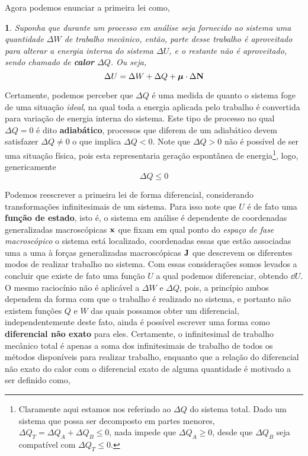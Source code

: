 \documentclass[twoside]{amsart}
\numberwithin{equation}{section}
\newcommand{\thistheoremname}{}
\newtheorem*{genericthm}{\thistheoremname}
\newenvironment{namedthm}[1]
  {\renewcommand{\thistheoremname}{#1}
   \begin{genericthm}}
  {\end{genericthm}}
\begin{document}
\begin{refsection}
Agora podemos enunciar a primeira lei como,

\begin{namedthm}{Primeira Lei}
    Suponha que durante um processo em análise seja fornecido ao sistema uma quantidade $\Delta W$ de trabalho mecânico, 
    então, parte desse trabalho é aproveitado para alterar a energia interna do sistema $\Delta U$, e o restante não é 
    aproveitado, sendo chamado de \textbf{calor} $\Delta Q$. Ou seja, \begin{equation}\Delta U=\Delta W+\Delta Q+\boldsymbol\mu\cdot\Delta\vb N\end{equation}
\end{namedthm}

Certamente, podemos perceber que $\Delta Q$ é uma medida de quanto o sistema foge de uma situação \emph{ideal}, na 
qual toda a energia aplicada pelo trabalho é convertida para variação de energia interna do sistema. Este tipo de 
processo no qual $\Delta Q=0$ é dito \textbf{adiabático}, processos que diferem de um adiabático devem satisfazer 
$\Delta Q\neq 0$ o que implica $\Delta Q<0$. Note que $\Delta Q>0$ não é possível de ser uma situação física, pois 
esta representaria geração espontânea de energia\footnote{Claramente aqui estamos nos referindo ao $\Delta Q$ do sistema 
total. Dado um sistema que possa ser decomposto em partes menores, $\Delta Q_T=\Delta Q_A+\Delta Q_B\leq 0$, nada 
impede que $\Delta Q_A\geq 0$, desde que $\Delta Q_B$ seja compatível com $\Delta Q_T\leq 0$.}, logo, genericamente 
$$\Delta Q\leq 0$$

Podemos reescrever a primeira lei de forma diferencial, considerando transformações infinitesimais de um sistema. Para isso 
note que $U$ é de fato uma \textbf{função de estado}, isto é, o sistema em análise é dependente de coordenadas 
generalizadas macroscópicas $\vb x$ que fixam em qual ponto do \emph{espaço de fase macroscópico} o sistema está 
localizado, coordenadas essas que estão associadas uma a uma à forças generalizadas macroscópicas $\vb J$ que descrevem 
os diferentes modos de realizar trabalho no sistema. Com essas considerações somos levados a concluir que existe de 
fato uma função $U$ a qual podemos diferenciar, obtendo $\dd{U}$. O mesmo raciocínio não é aplicável a $\Delta W$ 
e $\Delta Q$, pois, a princípio ambos dependem da forma com que o trabalho é realizado no sistema, e portanto não existem 
funções $Q$ e $W$ das quais possamos obter um diferencial, independentemente deste fato, ainda é 
possível escrever uma forma como \textbf{diferencial não exato} para eles. Certamente, o infinitesimal de trabalho mecânico 
total é apenas a soma dos infinitesimais de trabalho de todos os métodos disponíveis para realizar trabalho, enquanto que 
a relação do diferencial não exato do calor com o diferencial exato de alguma quantidade é motivado a ser definido como,


\end{refsection}
\end{document}
